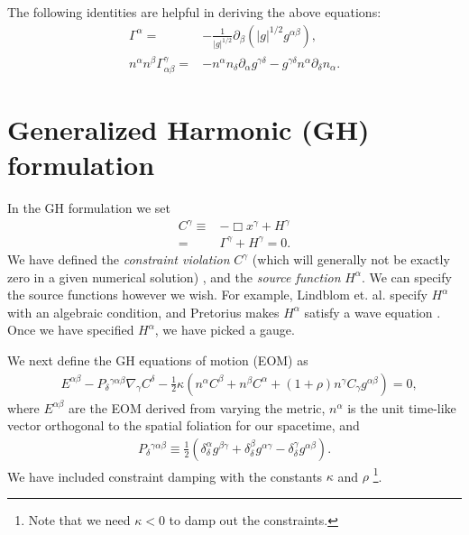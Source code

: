 \documentclass[%
notitlepage,
report,
nofootinbib,
 amsmath,amssymb,
 aps,
]{revtex4-1}
\begin{document}
   The following identities are helpful in deriving the above equations:
\begin{subequations}
\begin{align}
   \Gamma^{\alpha}
   =&
-  \frac{1}{|g|^{1/2}}\partial_{\beta}
   \left(
      |g|^{1/2}g^{\alpha\beta}
   \right)
   ,\\
   n^{\alpha}n^{\beta}\Gamma^{\gamma}_{\alpha\beta}
   =&
-  n^{\alpha}n_{\delta}\partial_{\alpha}g^{\gamma\delta}
-  g^{\gamma\delta}n^{\alpha}\partial_{\delta}n_{\alpha}
   .
\end{align}
\end{subequations}
\section{Generalized Harmonic (GH) formulation}
In the GH formulation we set
\begin{align}
\label{eq:gh_condition}
   C^{\gamma}
   \equiv&
   -\Box x^{\gamma}
+  H^{\gamma}
   \nonumber\\
   =& 
   \Gamma^{\gamma}
+  H^{\gamma} = 0
   .
\end{align} 
We have defined the \emph{constraint violation}
$C^{\gamma}$ (which will generally not be exactly zero in a given numerical solution)
, and the \emph{source function} $H^{\alpha}$.
We can specify the source functions however we wish.
For example, Lindblom et. al. \cite{Lindblom:2005qh} specify
$H^{\alpha}$ with an algebraic condition,
and Pretorius makes $H^{\alpha}$
satisfy a wave equation \cite{Pretorius:2004jg}.
Once we have specified $H^{\alpha}$, we have picked a gauge.

   We next define the GH equations of motion (EOM) as
\begin{align}
\label{eq:GH_tensor_eom}
   &
   E^{\alpha\beta} 
-  P_{\delta}{}^{\gamma\alpha\beta}\nabla_{\gamma}C^{\delta}
-  \frac{1}{2}\kappa
   \left(
      n^{\alpha}C^{\beta}
   +  n^{\beta}C^{\alpha}
   +  \left(1+\rho\right)n^{\gamma}C_{\gamma}g^{\alpha\beta}
   \right)
   =
   0
   ,
\end{align}
   where $E^{\alpha\beta}$ are the EOM derived from varying the metric,
$n^{\alpha}$ is the unit time-like vector orthogonal to the spatial foliation
for our spacetime, and
\begin{align}
   P_{\delta}{}^{\gamma\alpha\beta}
   \equiv
   \frac{1}{2}
   \left(
      \delta_{\delta}^{\alpha}g^{\beta\gamma}
   +  \delta_{\delta}^{\beta}g^{\alpha\gamma}
   -  \delta_{\delta}^{\gamma}g^{\alpha\beta}
   \right)
   .
\end{align}
   We have included constraint damping with the
constants $\kappa$ and $\rho$ \cite{Gundlach:2005eh}\footnote{Note
that we need $\kappa<0$ to damp out the constraints.}.
\end{document}
